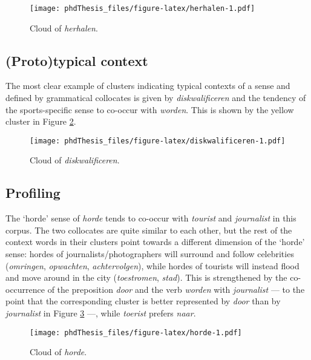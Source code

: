 \documentclass[
]{book}
\begin{document}
\begin{figure}
\centering
\texttt{[image: phdThesis\_files/figure-latex/herhalen-1.pdf]}
\caption{\label{fig:herhalen}Cloud of \emph{herhalen}.}
\end{figure}

\hypertarget{prototypical-context-1}{%
\subsection{(Proto)typical context}\label{prototypical-context-1}}

The most clear example of clusters indicating typical contexts of a sense and defined by grammatical collocates is given by \emph{diskwalificeren} and the tendency of the sports-specific sense to co-occur with \emph{worden}. This is shown by the yellow cluster in Figure \ref{fig:diskwalificeren}.



\begin{figure}
\centering
\texttt{[image: phdThesis\_files/figure-latex/diskwalificeren-1.pdf]}
\caption{\label{fig:diskwalificeren}Cloud of \emph{diskwalificeren}.}
\end{figure}

\hypertarget{profiling-1}{%
\subsection{Profiling}\label{profiling-1}}

The `horde' sense of \emph{horde} tends to co-occur with \emph{tourist} and \emph{journalist} in this corpus. The two collocates are quite similar to each other, but the rest of the context words in their clusters point towards a different dimension of the `horde' sense: hordes of journalists/photographers will surround and follow celebrities (\emph{omringen}, \emph{opwachten}, \emph{achtervolgen}), while hordes of tourists will instead flood and move around in the city (\emph{toestromen}, \emph{stad}). This is strengthened by the co-occurrence of the preposition \emph{door} and the verb \emph{worden} with \emph{journalist} --- to the point that the corresponding cluster is better represented by \emph{door} than by \emph{journalist} in Figure \ref{fig:horde} ---, while \emph{toerist} prefers \emph{naar}.



\begin{figure}
\centering
\texttt{[image: phdThesis\_files/figure-latex/horde-1.pdf]}
\caption{\label{fig:horde}Cloud of \emph{horde}.}
\end{figure}
\end{document}
